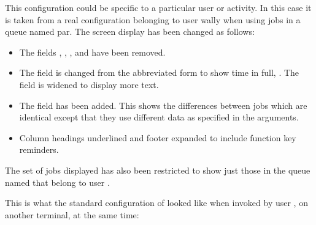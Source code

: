 This configuration could be specific to a particular user or activity.
In this case it is taken from a real configuration belonging to user
wally when using jobs in a queue named par. The screen display has been
changed as follows:

\begin{itemize}
\item The fields , , ,  and  have been removed.
\item The  field is changed from the abbreviated form to show time in full, . The 
field is widened to display more text.
\item The  field has been added. This shows the differences between jobs which are identical except that they
use different data as specified in the arguments.
\item Column headings underlined and footer expanded to include function key reminders.
\end{itemize}
The set of jobs displayed has also been restricted to show just those in the queue named  that belong to user
.

This is what the standard configuration of \PrBtq{} looked like when invoked by user , on
another terminal, at the same time:

